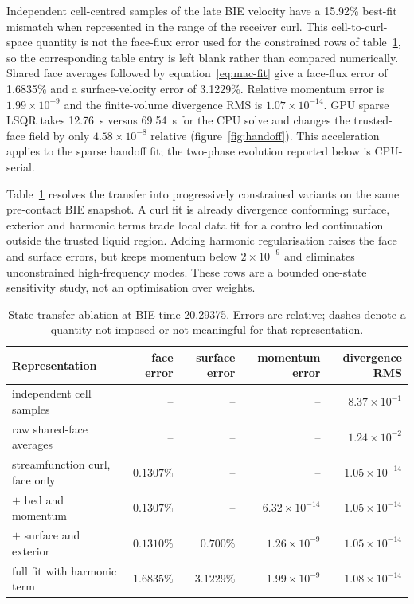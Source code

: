 \documentclass[11pt]{article}
\begin{document}
Independent cell-centred samples of the late BIE velocity have a 15.92\%
best-fit mismatch when represented in the range of the receiver curl.  This
cell-to-curl-space quantity is not the face-flux error used for the constrained
rows of table~\ref{tab:transfer-ablation}, so the corresponding table entry is
left blank rather than compared numerically.  Shared face averages followed by
equation~\eqref{eq:mac-fit} give a face-flux error of 1.6835\% and a
surface-velocity error of 3.1229\%.  Relative momentum error is
$1.99\times10^{-9}$ and the finite-volume divergence RMS is
$1.07\times10^{-14}$.  GPU sparse LSQR takes 12.76~s versus 69.54~s for the CPU
solve and changes the trusted-face field by only $4.58\times10^{-8}$ relative
(figure~\ref{fig:handoff}).  This acceleration applies to the sparse handoff
fit; the two-phase evolution reported below is CPU-serial.

Table~\ref{tab:transfer-ablation} resolves the transfer into progressively
constrained variants on the same pre-contact BIE snapshot.  A curl fit is
already divergence conforming; surface, exterior and harmonic terms trade
local data fit for a controlled continuation outside the trusted liquid
region.  Adding harmonic regularisation raises the face and surface errors,
but keeps momentum below $2\times10^{-9}$ and eliminates unconstrained
high-frequency modes.  These rows are a bounded one-state sensitivity study,
not an optimisation over weights.

\begin{table}[t]
\centering
\scriptsize
\caption{State-transfer ablation at BIE time 20.29375.  Errors are relative;
dashes denote a quantity not imposed or not meaningful for that representation.}
\label{tab:transfer-ablation}
\begin{tabular}{lrrrr}
\toprule
Representation & face error & surface error & momentum error & divergence RMS \\
\midrule
independent cell samples & -- & -- & -- & $8.37\times10^{-1}$ \\
raw shared-face averages & -- & -- & -- & $1.24\times10^{-2}$ \\
streamfunction curl, face only & $0.1307\%$ & -- & -- & $1.05\times10^{-14}$ \\
$+$ bed and momentum & $0.1307\%$ & -- & $6.32\times10^{-14}$ & $1.05\times10^{-14}$ \\
$+$ surface and exterior & $0.1310\%$ & $0.700\%$ & $1.26\times10^{-9}$ & $1.05\times10^{-14}$ \\
full fit with harmonic term & $1.6835\%$ & $3.1229\%$ & $1.99\times10^{-9}$ & $1.08\times10^{-14}$ \\
\bottomrule
\end{tabular}
\end{table}
\end{document}
